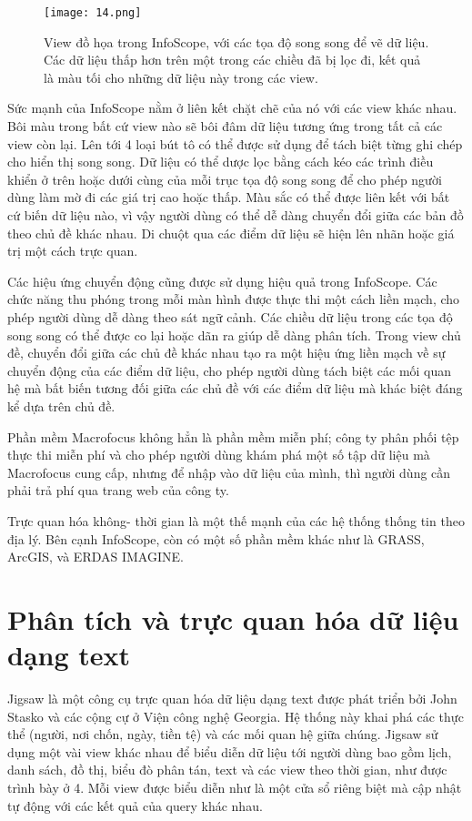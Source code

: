 \documentclass[13pt]{scrartcl} %
\begin{document}
\begin{figure}[!ht] %
    \centering
    \texttt{[image: 14.png]}
    \caption{View đồ họa trong InfoScope, với các tọa độ song song để vẽ dữ liệu. Các dữ liệu thấp hơn trên một trong các chiều đã bị lọc đi, kết quả là màu tối cho những dữ liệu này trong các view.}
\end{figure}


Sức mạnh của InfoScope nằm ở liên kết chặt chẽ của nó với các view khác nhau. Bôi màu trong bất cứ view nào sẽ bôi đâm dữ liệu tương ứng trong tất cả các view còn lại. Lên tới 4 loại bút tô có thể được sử dụng để tách biệt từng ghi chép cho hiển thị song song. Dữ liệu có thể dược lọc bằng cách kéo các trình điều khiển ở trên hoặc dưới cùng của mỗi trục tọa độ song song để cho phép người dùng làm mờ đi các giá trị cao hoặc thấp. Màu sắc có thể được liên kết với bất cứ biến dữ liệu nào, vì vậy người dùng có thể dễ dàng chuyển đổi giữa các bản đồ theo chủ đề khác nhau. Di chuột qua các điểm dữ liệu sẽ hiện lên nhãn hoặc giá trị một cách trực quan.

Các hiệu ứng chuyển động cũng được sử dụng hiệu quả trong InfoScope. Các chức năng thu phóng trong mỗi màn hình được thực thi một cách liền mạch, cho phép người dùng dễ dàng theo sát ngữ cảnh. Các chiều dữ liệu trong các tọa độ song song có thể được co lại hoặc dãn ra giúp dễ dàng phân tích. Trong view chủ đề, chuyển đổi giữa các chủ đề khác nhau tạo ra một hiệu ứng liền mạch về sự chuyển động của các điểm dữ liệu, cho phép người dùng tách biệt các mối quan hệ mà bất biến tương đối giữa các chủ đề với các điểm dữ liệu mà khác biệt đáng kể dựa trên chủ đề.

Phần mềm Macrofocus không hẳn là phần mềm miễn phí; công ty phân phối tệp thực thi miễn phí và cho phép người dùng khám phá một số tập dữ liệu mà Macrofocus cung cấp, nhưng để nhập vào dữ liệu của mình, thì người dùng cần phải trả phí qua trang web của công ty.

Trực quan hóa không- thời gian là một thế mạnh của các hệ thống thống tin theo địa lý. Bên cạnh InfoScope, còn có một số phần mềm khác như là GRASS, ArcGIS, và ERDAS IMAGINE.



\section{Phân tích và trực quan hóa dữ liệu dạng text}
Jigsaw là một công cụ trực quan hóa dữ liệu dạng text được phát triển bởi John Stasko và các cộng cự ở Viện công nghệ Georgia. Hệ thống này khai phá các thực thể (người, nơi chốn, ngày, tiền tệ) và các mối quan hệ giữa chúng. Jigsaw sử dụng một vài view khác nhau để biểu diễn dữ liệu tới người dùng bao gồm lịch, danh sách, đồ thị, biểu đò phân tán, text và các view theo thời gian, như được trình bày ở 4. Mỗi view được biểu diễn như là một cửa sổ riêng biệt mà cập nhật tự động với các kết quả của query khác nhau.
\end{document}
